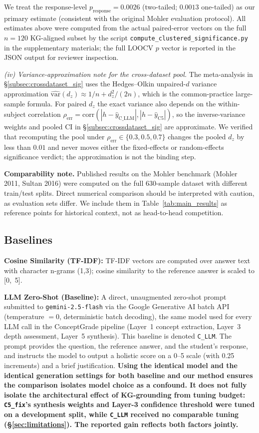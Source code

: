 \documentclass[conference]{IEEEtran}
\begin{document}
We treat the response-level $p_{\text{response}} = 0.0026$ (two-tailed; $0.0013$
one-tailed) as our primary estimate (consistent with the original Mohler
evaluation protocol). All estimates above were computed from the actual
paired-error vectors on the full $n=120$ KG-aligned subset by the script
\texttt{compute\_clustered\_significance.py} in the supplementary materials;
the full LOOCV $p$ vector is reported in the JSON output for reviewer
inspection.

\emph{(iv) Variance-approximation note for the cross-dataset pool.} The
meta-analysis in \S\ref{subsec:crossdataset_sig} uses the Hedges--Olkin
unpaired-$d$ variance approximation
$\widehat{\text{var}}(d_z) \approx 1/n + d_z^2/(2n)$, which is the
common-practice large-sample formula. For paired $d_z$ the exact variance
also depends on the within-subject correlation
$\rho_{\text{err}} = \text{corr}(|h - \hat{y}_{\text{C\_LLM}}|, |h -
\hat{y}_{\text{C5}}|)$, so the inverse-variance weights and pooled CI in
\S\ref{subsec:crossdataset_sig} are approximate. We verified that
recomputing the pool under $\rho_{\text{err}} \in \{0.3, 0.5, 0.7\}$
changes the pooled $d_z$ by less than $0.01$ and never moves either the
fixed-effects or random-effects significance verdict; the approximation is
not the binding step.

\textbf{Comparability note.} Published results on the Mohler benchmark (Mohler 2011,
Sultan 2016) were computed on the full 630-sample dataset with different
train/test splits. Direct numerical comparison should be interpreted with caution,
as evaluation sets differ. We include them in Table~\ref{tab:main_results} as
reference points for historical context, not as head-to-head competition.

\subsection{Baselines}

\textbf{Cosine Similarity (TF-IDF):} TF-IDF vectors are computed over answer text
with character n-grams (1,3); cosine similarity to the reference answer is scaled
to [0,~5].

\textbf{LLM Zero-Shot (Baseline):} A direct, unaugmented zero-shot prompt submitted to \texttt{gemini-2.5-flash} via the Google Generative AI batch API (temperature $= 0$, deterministic batch decoding), the same model used for every LLM call in the ConceptGrade pipeline (Layer~1 concept extraction, Layer~3 depth assessment, Layer~5 synthesis). This baseline is denoted \texttt{C\_LLM}. The prompt provides the question, the reference answer, and the student's response, and instructs the model to output a holistic score on a 0--5 scale (with 0.25 increments) and a brief justification. \textbf{Using the identical model and the identical generation settings for both baseline and our method ensures the comparison isolates model choice as a confound. It does not fully isolate the architectural effect of KG-grounding from tuning budget: \texttt{C5\_fix}'s synthesis weights and Layer-3 confidence threshold were tuned on a development split, while \texttt{C\_LLM} received no comparable tuning (\S\ref{sec:limitations}). The reported gain reflects both factors jointly.}
\end{document}
